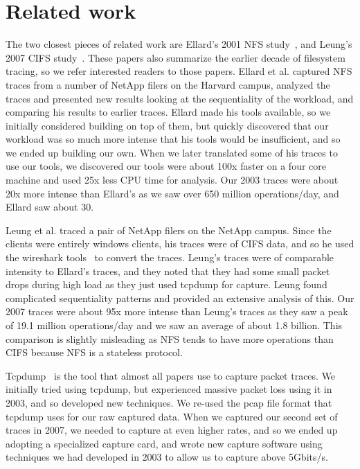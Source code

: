 \section{Related work}
\label{sec:related}

The two closest pieces of related work are Ellard's 2001 NFS
study~\cite{EllardFast03}, and Leung's 2007 CIFS
study~\cite{LeungUsenix08}.  These papers also summarize the earlier
decade of filesystem tracing, so we refer interested readers to those
papers.  Ellard et al. captured NFS traces from a number of NetApp
filers on the Harvard campus, analyzed the traces and presented new
results looking at the sequentiality of the workload, and comparing
his results to earlier traces.  Ellard made his tools available, so we
initially considered building on top of them, but quickly discovered
that our workload was so much more intense that his tools would be
insufficient, and so we ended up building our own.  When we later
translated some of his traces to use our tools, we discovered our
tools were about 100x faster on a four core machine and used 25x less
CPU time for analysis.  Our 2003 traces were about 20x more intense
than Ellard's as we saw over 650 million operations/day, and Ellard
saw about 30.

Leung et al. traced a pair of NetApp filers on the NetApp campus.
Since the clients were entirely windows clients, his traces were of
CIFS data, and so he used the wireshark tools~\cite{wireshark} to
convert the traces.  Leung's traces were of comparable intensity to
Ellard's traces, and they noted that they had some small packet drops
during high load as they just used tcpdump for capture.  Leung found
complicated sequentiality patterns and provided an extensive analysis
of this.  Our 2007 traces were about 95x more intense than Leung's
traces as they saw a peak of 19.1 million operations/day and we saw an
average of about 1.8 billion.  This comparison is slightly misleading
as NFS tends to have more operations than CIFS because NFS is a
stateless protocol.

Tcpdump~\cite{tcpdump} is the tool that almost all papers use to capture packet
traces.  We initially tried using tcpdump, but experienced massive
packet loss using it in 2003, and so developed new techniques.  We
re-used the pcap file format that tcpdump uses for our raw captured
data.  When we captured our second set of traces in 2007, we needed to
capture at even higher rates, and so we ended up adopting a
specialized capture card, and wrote new capture software using
techniques we had developed in 2003 to allow us to capture above
5Gbits/s.

